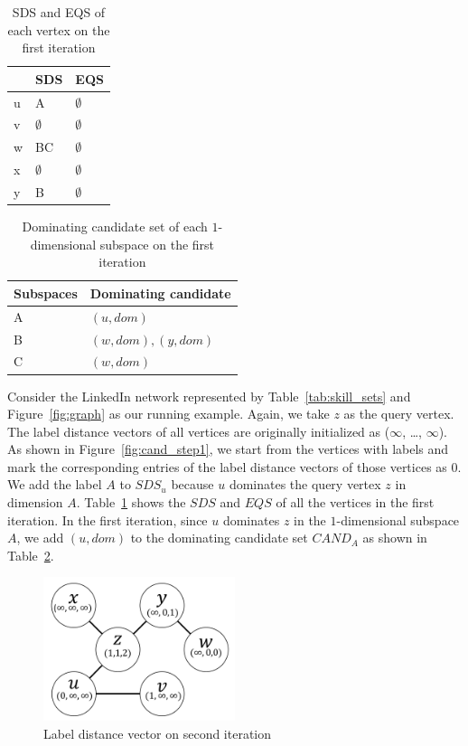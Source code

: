 \begin{table}[H]
    \centering
    \begin{tabular}{|l|l|l|}
    \hline
      & SDS         & EQS         \\ \hline
    u & A           & $\emptyset$ \\ \hline
    v & $\emptyset$ & $\emptyset$ \\ \hline
    w & BC          & $\emptyset$ \\ \hline
    x & $\emptyset$ & $\emptyset$ \\ \hline
    y & B           & $\emptyset$ \\ \hline
    \end{tabular}
    \caption{SDS and EQS of each vertex on the first iteration}
    \label{tab:sds_step1}
\end{table}

\begin{table}[H]
    \centering
    \begin{tabular}{|l|l|}
    \hline
    Subspaces & Dominating candidate \\ \hline
    A         & $(u, dom)$            \\ \hline
    B         & $(w, dom), (y, dom)$            \\ \hline
    C         & $(w, dom)$            \\ \hline
    \end{tabular}
    \caption{Dominating candidate set of each $1$-dimensional subspace on the first iteration}
    \label{tab:cand_set_step1}
\end{table}

Consider the LinkedIn network represented by Table~\ref{tab:skill_sets} and Figure~\ref{fig:graph} as our running example. Again, we take $z$ as the query vertex. The label distance vectors of all vertices are originally initialized as ($\infty$, \dots, $\infty$). As shown in Figure~\ref{fig:cand_step1}, we start from the vertices with labels and mark the corresponding entries of the label distance vectors of those vertices as $0$. 
We add the label $A$ to $\mathit{SDS}_u$ because $u$ dominates the query vertex $z$ in dimension $A$. Table~\ref{tab:sds_step1} shows the $\mathit{SDS}$ and $\mathit{EQS}$ of all the vertices in the first iteration.
In the first iteration, since $u$ dominates $z$ in the $1$-dimensional subspace $A$, we add $(u, dom)$ to the dominating candidate set $\mathit{CAND}_A$ as shown in Table~\ref{tab:cand_set_step1}.

\begin{figure}[H]
    \centering
    \includegraphics[width=0.5\textwidth]{figs/graph_example_2}
    \caption{Label distance vector on second iteration}
    \label{fig:cand_step2}
\end{figure}

